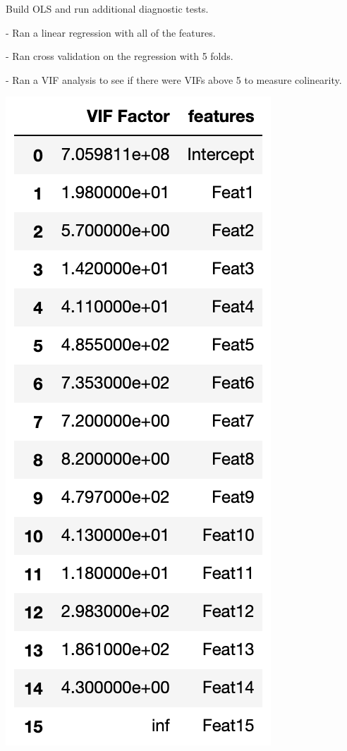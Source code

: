 \documentclass[11pt]{article}
\begin{document}
Build OLS and run additional diagnostic tests. 

- Ran a linear regression with all of the features. 

- Ran cross validation on the regression with 5 folds.

- Ran a VIF analysis to see if there were VIFs above 5 to measure colinearity. 
\begin{center}
	\includegraphics[scale=0.6]{vif}
\end{center}
\end{document}
